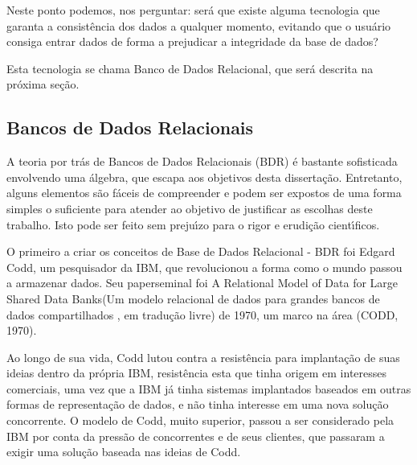 \documentclass[
12pt,		%
openright,	%
twoside,  %
a4paper,			%
chapter=TITLE,		%
english,			%
french,				%
spanish,			%
brazil				%
]{USPSC-classe/USPSC}
\begin{document}
Neste ponto podemos, nos perguntar: ser\'a que existe alguma tecnologia que garanta a consist\^encia dos dados a qualquer momento, evitando que o usu\'ario consiga entrar dados de forma a prejudicar a integridade da base de dados?









Esta tecnologia se chama \textquotedbl Banco de Dados Relacional\textquotedbl , que ser\'a descrita na pr\'oxima se\c{c}\~ao.









\subsection[Bancos de Dados Relacionais]{Bancos de Dados Relacionais}\label{Bancos de Dados Relacionais}
A teoria por tr\'as de Bancos de Dados Relacionais (BDR) \'e bastante sofisticada envolvendo uma \'algebra, que escapa aos objetivos desta disserta\c{c}\~ao. Entretanto, alguns elementos s\~ao f\'aceis de compreender e podem ser expostos  de uma forma simples o suficiente para atender ao objetivo de justificar as escolhas deste trabalho. Isto pode ser feito sem preju\'{\i}zo para o rigor e erudi\c{c}\~ao cient\'{\i}ficos.









O primeiro a criar os conceitos de Base de Dados Relacional - BDR foi Edgard Codd, um pesquisador da IBM, que revolucionou a forma como o mundo passou a armazenar dados. Seu \textquotedbl paper\textquotedbl  seminal foi  \textquotedbl A Relational Model of Data for Large Shared Data Banks\textquotedbl  (\textquotedbl Um modelo relacional de dados para grandes bancos de dados compartilhados \textquotedbl , em tradu\c{c}\~ao livre) de 1970, um marco na \'area (CODD, 1970).









Ao longo de sua vida, Codd lutou contra a resist\^encia para implanta\c{c}\~ao de suas ideias dentro da pr\'opria IBM, resist\^encia esta que tinha origem em interesses comerciais, uma vez que a IBM j\'a tinha sistemas implantados baseados em outras formas de representa\c{c}\~ao de dados, e n\~ao tinha interesse em uma nova solu\c{c}\~ao concorrente. O modelo de Codd, muito superior, passou a ser considerado pela IBM por conta da press\~ao de concorrentes e de seus clientes, que passaram a exigir uma solu\c{c}\~ao baseada nas ideias de Codd.
\end{document}
